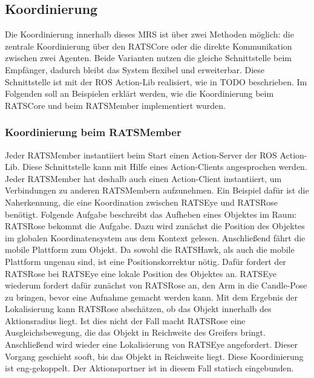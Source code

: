 \subsection{Koordinierung}
Die Koordinierung innerhalb dieses MRS ist über zwei Methoden möglich: die zentrale Koordinierung über den RATSCore oder die direkte Kommunikation zwischen zwei Agenten. Beide Varianten nutzen die gleiche Schnittstelle beim Empfänger, dadurch bleibt das System flexibel und erweiterbar. Diese Schnittstelle ist mit der ROS Action-Lib realisiert, wie in TODO beschrieben. Im Folgenden soll an Beispielen erklärt werden, wie die Koordinierung beim RATSCore und beim RATSMember implementiert wurden.

\subsubsection{Koordinierung beim RATSMember}
Jeder RATSMember instantiiert beim Start einen Action-Server der ROS Action-Lib. Diese Schnittstelle kann mit Hilfe eines Action-Clients angesprochen werden. Jeder RATSMember hat deshalb auch einen Action-Client instantiiert, um Verbindungen zu anderen RATSMembern aufzunehmen. Ein Beispiel dafür ist die Naherkennung, die eine Koordination zwischen RATSEye und RATSRose benötigt. Folgende Aufgabe beschreibt das Aufheben eines Objektes im Raum: RATSRose bekommt die Aufgabe. Dazu wird zunächst die Position des Objektes im globalen Koordinatensystem aus dem Kontext gelesen. Anschließend fährt die mobile Plattform zum Objekt. Da sowohl die RATSHawk, als auch die mobile Plattform ungenau sind, ist eine Positionskorrektur nötig. Dafür fordert der RATSRose bei RATSEye eine lokale Position des Objektes an. RATSEye wiederum fordert dafür zunächst von RATSRose an, den Arm in die Candle-Pose zu bringen, bevor eine Aufnahme gemacht werden kann. Mit dem Ergebnis der Lokalisierung kann RATSRose abschätzen, ob das Objekt innerhalb des Aktionsradius liegt. Ist dies nicht der Fall macht RATSRose eine Ausgleichsbewegung, die das Objekt in Reichweite des Greifers bringt. Anschließend wird wieder eine Lokalisierung von RATSEye angefordert. Dieser Vorgang geschieht sooft, bis das Objekt in Reichweite liegt. Diese Koordinierung ist eng-gekoppelt. Der Aktionspartner ist in diesem Fall statisch eingebunden.


